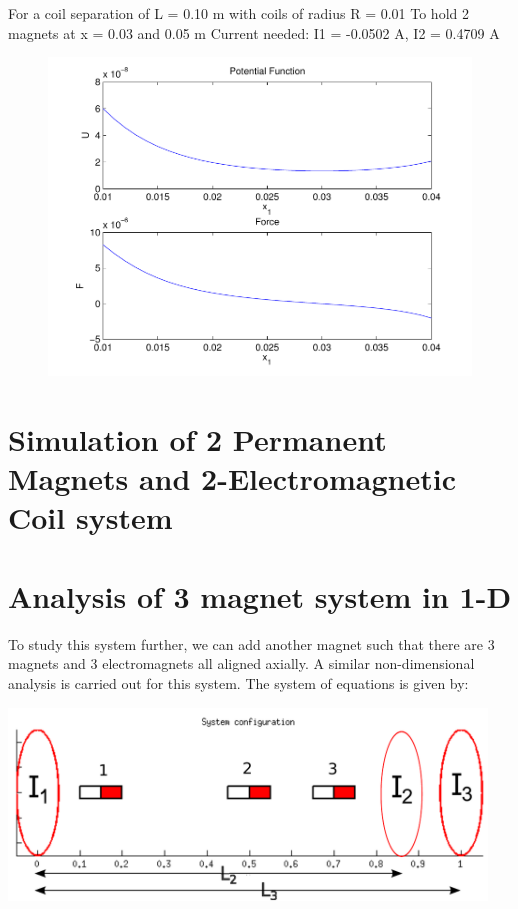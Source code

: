 \documentclass[english]{article}
\begin{document}
For a coil separation of L = 0.10 m with coils of radius R = 0.01 
To hold 2 magnets at x = 0.03 and 0.05 m
Current needed: I1 = -0.0502 A, I2 =  0.4709 A 
\begin{figure}[H]
	\centering
	\includegraphics[width=5in]{figures/UF_stable.pdf}
\end{figure}

\section{Simulation of 2 Permanent Magnets and 2-Electromagnetic Coil system}



\section{Analysis of 3 magnet system in 1-D}
To study this system further, we can add another magnet such that there are 3 magnets and 3 electromagnets all aligned axially.  A similar non-dimensional analysis is carried out for this system.  The system of equations is given by:
\begin{center}
\includegraphics[width=5in]{figures/3magdrawing.pdf}
\end{center}
\end{document}
